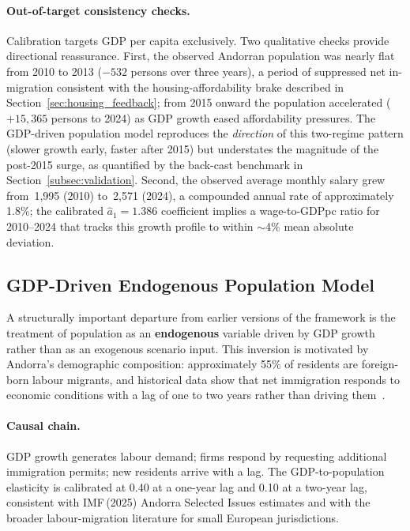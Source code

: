 \documentclass[urbansci,article,submit,pdftex,moreauthors]{Definitions/mdpi}
\begin{document}
\paragraph{Out-of-target consistency checks.}
Calibration targets GDP per capita exclusively. Two qualitative checks provide
directional reassurance. First, the observed Andorran population was nearly flat
from 2010 to 2013 ($-532$ persons over three years), a period of suppressed
net in-migration consistent with the housing-affordability brake described in
Section~\ref{sec:housing_feedback}; from 2015 onward the population
accelerated ($+15{,}365$ persons to 2024) as GDP growth eased affordability
pressures. The GDP-driven population model reproduces the \emph{direction} of this
two-regime pattern (slower growth early, faster after 2015) but understates the
magnitude of the post-2015 surge, as quantified by the back-cast benchmark in
Section~\ref{subsec:validation}. Second, the observed average monthly salary grew from
\EUR\,1{,}995 (2010) to \EUR\,2{,}571 (2024), a compounded annual rate of
approximately 1.8\%; the calibrated $\hat{a}_1=1.386$ coefficient implies a
wage-to-GDPpc ratio for 2010--2024 that tracks this growth profile to within
$\sim$4\% mean absolute deviation.

\subsection{GDP-Driven Endogenous Population Model}
\label{sec:gdp_pop_model}

A structurally important departure from earlier versions of the framework is
the treatment of population as an \textbf{endogenous} variable driven by GDP
growth rather than as an exogenous scenario input. This inversion is motivated
by Andorra's demographic composition: approximately 55\% of residents are
foreign-born labour migrants, and historical data show that net immigration
responds to economic conditions with a lag of one to two years rather than
driving them~\cite{imf2025andorra,worldbank2024}.

\paragraph{Causal chain.}
GDP growth generates labour demand; firms respond by requesting additional
immigration permits; new residents arrive with a lag. The GDP-to-population
elasticity is calibrated at 0.40 at a one-year lag and 0.10 at a two-year lag,
consistent with IMF\,(2025) Andorra Selected Issues estimates and with the
broader labour-migration literature for small European jurisdictions.
\end{document}
